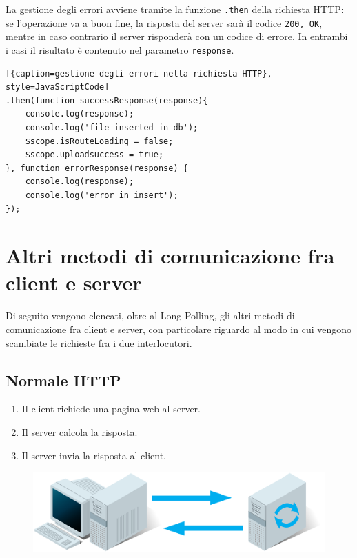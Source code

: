 La gestione degli errori avviene tramite la funzione \texttt{.then} 
della richiesta HTTP: se l'operazione va a buon fine, la risposta 
del server sarà il codice \texttt{200, OK}, mentre in caso 
contrario il server risponderà con un codice di errore. In entrambi 
i casi il risultato è contenuto nel parametro \texttt{response}.

\begin{lstlisting}[{caption=gestione degli errori nella richiesta HTTP}, style=JavaScriptCode]
.then(function successResponse(response){
	console.log(response);
	console.log('file inserted in db');
	$scope.isRouteLoading = false;
	$scope.uploadsuccess = true;
}, function errorResponse(response) {
	console.log(response);
	console.log('error in insert');
});
\end{lstlisting}

\section{Altri metodi di comunicazione fra client e server}
Di seguito vengono elencati, oltre al Long Polling, gli altri 
metodi di comunicazione fra client e server, con particolare 
riguardo al modo in cui vengono scambiate le richieste fra i 
due interlocutori.

\subsection{Normale HTTP}
\begin{enumerate}
	\item Il client richiede una pagina web al server.
	\item Il server calcola la risposta.
	\item Il server invia la risposta al client.
\end{enumerate}
\begin{figure}[h]
	\centering
	\includegraphics[scale=0.4]{Immagini/regular_http.png}
\end{figure}

